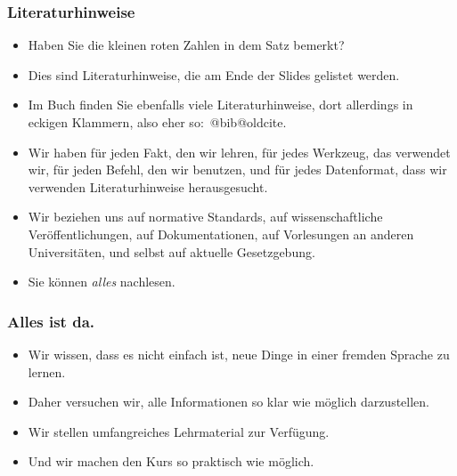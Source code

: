 \documentclass[aspectratio=169,mathserif,notheorems]{beamer}%
\begin{document}
\begin{frame}%
\frametitle{Literaturhinweise}%
\begin{itemize}%
\item Haben Sie die kleinen roten Zahlen in dem Satz \emph{} bemerkt?%
\item<2-> Dies sind Literaturhinweise, die am Ende der Slides gelistet werden.%
\item<3-> Im Buch \cite{databases} finden Sie ebenfalls viele Literaturhinweise, dort allerdings in eckigen Klammern, also eher so:~\makeatletter\csname @bib@oldcite\makeatother.%
\item<4-> Wir haben für jeden Fakt, den wir lehren, für jedes Werkzeug, das verwendet wir, für jeden Befehl, den wir benutzen, und für jedes Datenformat, dass wir verwenden Literaturhinweise herausgesucht.%
\item<5-> Wir beziehen uns auf normative Standards, auf wissenschaftliche Veröffentlichungen, auf Dokumentationen, auf Vorlesungen an anderen Universitäten, und selbst auf aktuelle Gesetzgebung.%
\item<6-> Sie können \emph{alles} nachlesen.%
\end{itemize}%
\end{frame}%
%
\begin{frame}%
\frametitle{Alles ist da.}%
\begin{itemize}%
\item Wir wissen, dass es nicht einfach ist, neue Dinge in einer fremden Sprache zu lernen.%
\item<2-> Daher versuchen wir, alle Informationen so klar wie möglich darzustellen.%
\item<3-> Wir stellen umfangreiches Lehrmaterial zur Verfügung.%
\item<4-> Und wir machen den Kurs so praktisch wie möglich.%
\end{itemize}%
\end{frame}%
%
\end{document}
